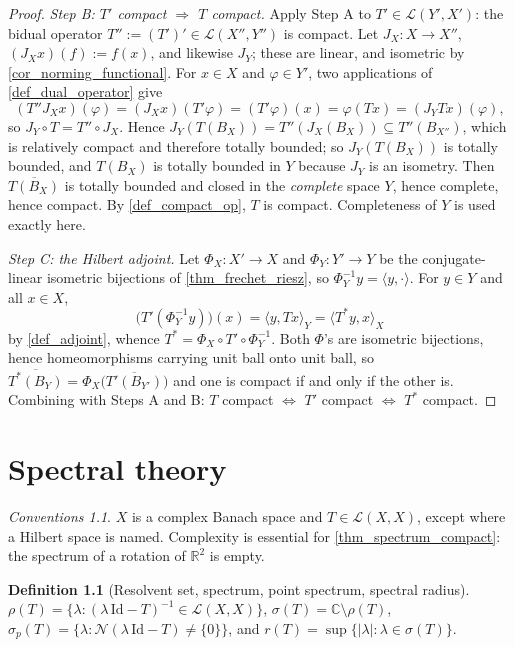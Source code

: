 \documentclass[a4paper]{report}
\theoremstyle{plain}
\theoremstyle{definition}
\newtheorem{definition}[theorem]{Definition}
\theoremstyle{remark}
\newtheorem{assumptions}[theorem]{Conventions}
\begin{document}
\begin{proof}
  \emph{Step B: $T'$ compact $\Rightarrow$ $T$ compact.}  Apply Step A to
  $T' \in \mathcal{L}(Y',X')$: the bidual operator
  $T'' := (T')' \in \mathcal{L}(X'',Y'')$ is compact.  Let $J_X \colon X \to X''$,
  $(J_Xx)(f) := f(x)$, and likewise $J_Y$; these are linear, and isometric by
  \cref{cor_norming_functional}.  For $x \in X$ and $\varphi \in Y'$, two applications of
  \cref{def_dual_operator} give
  \[
    (T''J_Xx)(\varphi) = (J_Xx)(T'\varphi) = (T'\varphi)(x) = \varphi(Tx)
      = (J_Y Tx)(\varphi),
  \]
  so $J_Y \circ T = T'' \circ J_X$.  Hence
  $J_Y(T(B_X)) = T''(J_X(B_X)) \subseteq T''(B_{X''})$, which is relatively compact and
  therefore totally bounded; so $J_Y(T(B_X))$ is totally bounded, and $T(B_X)$ is totally
  bounded in $Y$ because $J_Y$ is an isometry.  Then $\overline{T(B_X)}$ is totally bounded and closed in the \emph{complete} space $Y$, hence
  complete, hence compact.  By
  \cref{def_compact_op}, $T$ is compact.  Completeness of $Y$ is used exactly here.

  \emph{Step C: the Hilbert adjoint.}  Let $\Phi_X \colon X' \to X$ and
  $\Phi_Y \colon Y' \to Y$ be the conjugate-linear isometric bijections of
  \cref{thm_frechet_riesz}, so $\Phi_Y^{-1}y = \langle y,\cdot\rangle$.  For $y \in Y$ and
  all $x \in X$,
  \[
    \bigl(T'(\Phi_Y^{-1}y)\bigr)(x) = \langle y, Tx\rangle_Y = \langle T^*y, x\rangle_X
  \]
  by \cref{def_adjoint}, whence $T^* = \Phi_X \circ T' \circ \Phi_Y^{-1}$.  Both $\Phi$'s
  are isometric bijections, hence homeomorphisms carrying unit ball onto unit ball, so
  $\overline{T^*(B_Y)} = \Phi_X\bigl(\overline{T'(B_{Y'})}\bigr)$ and one is compact if and
  only if the other is.  Combining with Steps A and B: $T$ compact $\iff$ $T'$ compact
  $\iff$ $T^*$ compact.
\end{proof}



\chapter{Spectral theory}
\label{ch_07_spectral_theory}

\begin{assumptions}
  \label{asm_spectral_theory}
  $X$ is a complex Banach space and
$T \in \mathcal{L}(X,X)$, except where a Hilbert space is named.
Complexity is essential
for \cref{thm_spectrum_compact}: the spectrum of a rotation of $\mathbb{R}^2$ is empty.
\end{assumptions}

\begin{definition}[Resolvent set, spectrum, point spectrum, spectral radius]
  \label{def_spectrum}
  $\rho(T) = \{\lambda : (\lambda\,\mathrm{Id}-T)^{-1} \in \mathcal{L}(X,X)\}$,
  $\sigma(T) = \mathbb{C}\setminus\rho(T)$,
  $\sigma_p(T) = \{\lambda : \mathcal{N}(\lambda\,\mathrm{Id}-T) \ne \{0\}\}$, and
  $r(T) = \sup\{|\lambda| : \lambda \in \sigma(T)\}$.
\end{definition}
\end{document}
